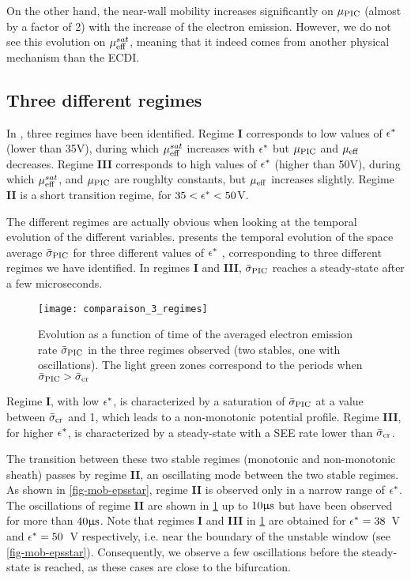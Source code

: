   On the other hand, the near-wall mobility increases significantly on $\mu_{\mathrm{PIC}}$ (almost by a factor of 2) with the increase of the electron emission.
  However, we do not see this evolution on $\mu_{\mathrm{eff}}^{sat}$, meaning that it indeed comes from another physical mechanism than the \ac{ECDI}.
  
  
  \subsection{Three different regimes}
  \label{subsec-regimes}

  In , three regimes have been identified.
  Regime {\bf I} corresponds to low values of $\epsilon^{*}$ (lower than 35V), during which $\mu_{\mathrm{eff}}^{sat}$ increases with $\epsilon^{*}$ but $\mu_{\mathrm{PIC}}$ and $\mu_{\mathrm{eff}}$ decreases.
  Regime {\bf III} corresponds to high values of $\epsilon^{*}$ (higher than 50V), during which $\mu_{\mathrm{eff}}^{sat}$, and  $\mu_{\mathrm{PIC}}$ are roughlty constants, but $\mu_{\mathrm{eff}}$ increases slightly.
  Regime {\bf II} is a short transition regime, for $35 < \epsilon^{*} < 50$V.
  
  The different regimes are actually obvious when looking at the temporal evolution of the different variables.
    presents the temporal evolution of the space average $ \bar{\sigma }_{\rm PIC}$ for three different
  values of $\epsilon^{*}$ , corresponding to three different regimes we have identified.
  In regimes {\bf I} and {\bf III}, $ \bar{\sigma }_{\rm PIC}$ reaches a steady-state after a few microseconds.

  \begin{figure}[hbt]
    \centering
    \texttt{[image: comparaison\_3\_regimes]}
    \caption{Evolution as a function of time of the averaged electron emission rate $ \bar{\sigma }_{\rm PIC}$ in the three regimes observed (two stables, one with oscillations). The light green zones correspond to the periods when $ \bar{\sigma }_{\rm PIC} >  \bar{\sigma }_{\rm cr}$}
    \label{fig-threeregimes}
  \end{figure}
  

  Regime {\bf I}, with low $\epsilon^{*}$, is characterized by a saturation of $ \bar{\sigma }_{\rm PIC}$ at a value between $ \bar{\sigma }_{\rm cr}$ and 1, which leads to a non-monotonic potential profile.
  Regime {\bf III}, for higher $\epsilon^{*}$, is characterized by a steady-state with a SEE rate lower than $ \bar{\sigma }_{\rm cr}$.

  The transition between these two stable regimes (monotonic and non-monotonic sheath) passes by regime {\bf II}, an oscillating mode between the two stable regimes.
 As shown in \cref{fig-mob-epsstar}, regime {\bf II} is observed only in a narrow range of $\epsilon^{*}$.
 The oscillations of regime {\bf II} are shown in \cref{fig-threeregimes} up to $10\mathrm{\upmu s}$ but have been observed for more than $40\mathrm{\upmu s}$.
 Note that regimes {\bf I} and {\bf III} in \cref{fig-threeregimes} are obtained for $\epsilon^{*} = 38$~V and $\epsilon^{*} = 50$~V respectively, i.e. near the boundary of the unstable window (see \cref{fig-mob-epsstar}).
 Consequently, we observe a few oscillations before the steady-state is reached, as these cases are close to the bifurcation.
   
